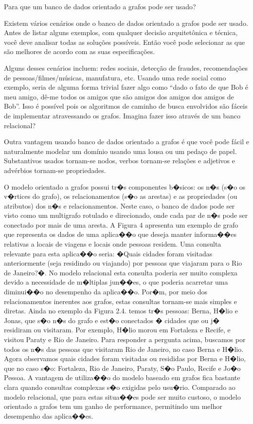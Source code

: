 \documentclass[12pt]{article}
\begin{document}
Para que um banco de dados orientado a grafos pode ser usado?

Existem vários cenários onde o banco de dados orientado a grafos pode ser usado. Antes de listar alguns exemplos, com qualquer decisão arquitetônica e técnica, você deve analisar todas as soluções possíveis. Então você pode selecionar as que são melhores de acordo com as suas especificações.

Alguns desses cenários incluem: redes sociais, detecção de fraudes, recomendações de pessoas/filmes/músicas, manufatura, etc. Usando uma rede social como exemplo, seria de alguma forma trivial fazer algo como “dado o fato de que Bob é meu amigo, dê-me todos os amigos que são amigos dos amigos dos amigos de Bob”. Isso é possível pois os algoritmos de caminho de busca envolvidos são fáceis de implementar atravessando os grafos. Imagina fazer isso através de um banco relacional?

Outra vantagem usando banco de dados orientado a grafos é que você pode fácil e naturalmente modelar um domínio usando uma lousa ou um pedaço de papel.  Substantivos usados tornam-se nodos, verbos tornam-se relações e adjetivos e advérbios tornam-se propriedades.

O modelo orientado a grafos possui tr�s componentes b�sicos: os n�s (s�o os v�rtices do grafo), os relacionamentos (s�o as arestas) e as propriedades (ou atributos) dos n�s e relacionamentos. Neste caso, o banco de dados pode ser visto como um multigrafo rotulado e direcionado, onde cada par de n�s pode ser conectado por mais de uma aresta. A Figura 4 apresenta um exemplo de grafo que representa os dados de uma aplica��o que deseja manter informa��es relativas a locais de viagens e locais onde pessoas residem. Uma consulta relevante para esta aplica��o seria: �Quais cidades 
foram visitadas anteriormente (seja residindo ou viajando) por pessoas que viajaram para o Rio de Janeiro?�. No modelo relacional esta consulta poderia ser muito complexa devido a necessidade de m�ltiplas jun��es, o que poderia acarretar uma diminui��o no desempenho da aplica��o. Por�m, por meio dos relacionamentos inerentes aos grafos, estas consultas tornam-se mais simples e diretas. 
Ainda no exemplo da Figura 2.4. temos tr�s pessoas: Berna, H�lio e Jonas, que s�o n�s do grafo e est�o conectados � cidades que ou j� residiram ou visitaram. Por exemplo, H�lio morou em Fortaleza e Recife, e visitou Paraty e Rio de Janeiro. Para responder a pergunta acima, buscamos por todos os n�s das pessoas que visitaram Rio de Janeiro, no caso Berna e H�lio. Agora observamos quais cidades foram visitadas ou resididas por Berna e H�lio, que no caso s�o: Fortaleza, Rio de Janeiro, Paraty, S�o Paulo, Recife e Jo�o Pessoa. 
A vantagem de utiliza��o do modelo baseado em grafos fica bastante clara quando consultas complexas s�o exigidas pelo usu�rio. Comparado ao modelo 
relacional, que para estas situa��es pode ser muito custoso, o modelo orientado a grafos tem um ganho de performance, permitindo um melhor desempenho das aplica��es. 
\end{document}
